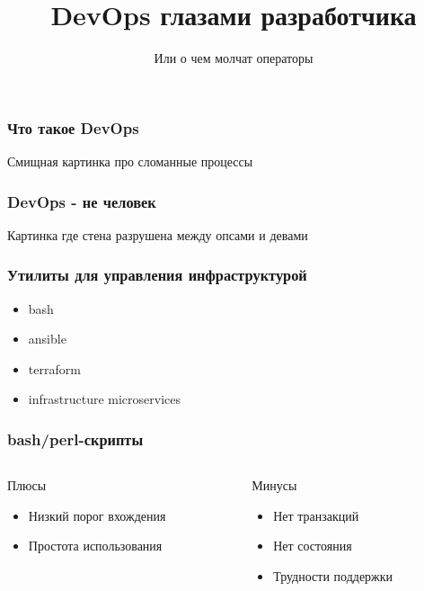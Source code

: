 \documentclass[mathserif,serif]{beamer}
\title[DevOps глазами разработчика]
{DevOps глазами разработчика}
\subtitle{Или о чем молчат операторы}
\date
{}
\begin{document}
\frame{\titlepage}

\begin{frame}
	\frametitle{Что такое DevOps}
Смищная картинка про сломанные процессы
\end{frame}

\begin{frame}
	\frametitle{DevOps - не человек}
Картинка где стена разрушена между опсами и девами
\end{frame}

\begin{frame}
	\frametitle{Утилиты для управления инфраструктурой}
	\begin{itemize}
		\item{bash}
		\item{ansible}
		\item{terraform}
		\item{infrastructure microservices}
	\end{itemize}
\end{frame}

\begin{frame}
	\frametitle{bash/perl-скрипты}
	\begin{columns}[T]
		\begin{column}{.5\linewidth}
			\begin{minipage}[c][\textheight][c]{\linewidth}
          			Плюсы
				\begin{itemize}
					\item{Низкий порог вхождения}
					\item{Простота использования}
				\end{itemize}
			\end{minipage}
		\end{column}
		\begin{column}{.5\linewidth}
			\begin{minipage}[c][\textheight][c]{\linewidth}
          			Минусы
				\begin{itemize}
					\item{Нет транзакций}
					\item{Нет состояния}
					\item{Трудности поддержки}
				\end{itemize}
			\end{minipage}
		\end{column}
	\end{columns}
\end{frame}
\end{document}
